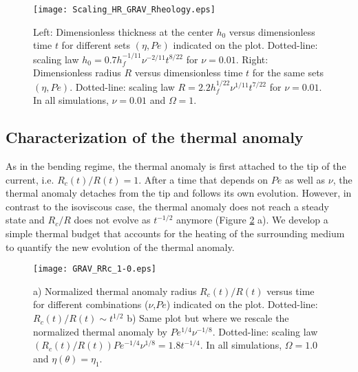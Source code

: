 \begin{figure}[h!]
  \begin{center}
    \graphicspath{ {/Users/thorey/Documents/These/Projet/Refroidissement/Skin_Model/Figure/Figure_Heating/} }
    \texttt{[image: Scaling\_HR\_GRAV\_Rheology.eps]}
    \caption{Left: Dimensionless thickness at  the center $h_0$ versus
      dimensionless time $t$ for  different sets $(\eta,Pe)$ indicated
      on      the      plot.        Dotted-line:      scaling      law
      $h_0= 0.7h_f^{-1/11}\nu^{-2/11}t^{8/22}$ for $\nu=0.01$.  Right:
      Dimensionless radius  $R$ versus dimensionless time  $t$ for the
      same    sets    $(\eta,Pe)$.      Dotted-line:    scaling    law
      $R=  2.2h_f^{1/22}\nu^{1/11}t^{7/22}$ for  $\nu  =0.01$. In  all
      simulations, $\nu=0.01$ and $\Omega=1$.}
    \label{C4-HR_GRAV_Rheology}
  \end{center}
\end{figure}

\subsection{Characterization of the thermal anomaly}
\label{C4-sec:char-therm-anom-2}

As in the bending regime, the thermal anomaly is first attached to the
tip of the current, i.e. $R_c(t)/R(t)=1$. After a time that depends on
$Pe$ as well  as $\nu$, the thermal anomaly detaches  from the tip and
follows  its own  evolution. However,  in contrast  to the  isoviscous
case, the  thermal anomaly does not  reach a steady state  and $R_c/R$
does     not     evolve      as     $t^{-1/2}$     anymore     (Figure
\ref{C4-GRAV_RRc_RArrhenius_1-0}  a).   We  develop a  simple  thermal
budget  that accounts  for the  heating of  the surrounding  medium to
quantify the new evolution of the thermal anomaly.
\begin{figure}[h!]
  \begin{center}
    \graphicspath{ {/Users/thorey/Documents/These/Projet/Refroidissement/Skin_Model/Figure/Figure_Heating/} }
    \texttt{[image: GRAV\_RRc\_1-0.eps]}
    \caption{a) Normalized thermal anomaly radius $R_c(t)/R(t)$ versus
      time for  different combinations  ($\nu$,$Pe$) indicated  on the
      plot.  Dotted-line:  $R_c(t)/R(t)\sim t^{1/2}$ b) Same  plot but
      where   we   rescale   the   normalized   thermal   anomaly   by
      $Pe^{1/4}\nu^{-1/8}$.        Dotted-line:      scaling       law
      $(R_c(t)/R(t))Pe^{-1/4}\nu^{1/8}=    1.8t^{-1/4}$.     In    all
      simulations, $\Omega=1.0$ and $\eta(\theta)=\eta_1$.}
    \label{C4-GRAV_RRc_RArrhenius_1-0}
  \end{center}
\end{figure}

